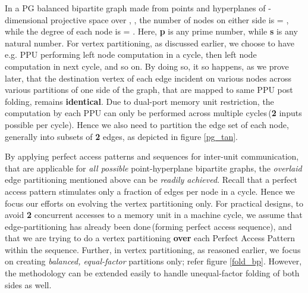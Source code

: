 \documentclass[12pt]{article}
\begin{document}
In a PG balanced bipartite graph made from points and hyperplanes of
{\normalsize }-dimensional projective space over {\normalsize },
{\normalsize }, the number of nodes on either side is
{\large } = {\large }, while the degree of
each node is {\large } = {\large }. Here,
{\normalsize \textbf{p}} is any prime number, while {\normalsize \textbf{s}} is any
natural number.
For vertex partitioning, as discussed earlier, we choose to have e.g.  PPU performing  left node computation in a cycle, then 
left node computation in next cycle, and so on. By doing so, it so happens,
as we prove later, that the destination vertex of each edge incident on
various nodes across various partitions of one side of the graph,
that are mapped to same PPU post folding, remains
\textbf{identical}. Due to dual-port memory unit restriction, the
computation by each PPU can only be performed
across multiple cycles\,(\textbf{2} inputs possible per cycle). Hence we also
need to partition the edge set of each node, generally into subsets of \textbf{2}
edges, as depicted in figure \ref{pg_tan}.

By applying perfect access patterns and sequences \cite{karm1} for
inter-unit communication, that are applicable for \textit{all possible} 
point-hyperplane bipartite graphs, the \textit{overlaid} edge partitioning mentioned above can be
\textit{readily achieved}.  Recall that a perfect access pattern stimulates only a
fraction of edges per node in a cycle. Hence we focus our efforts on
evolving the vertex partitioning  only.
For practical designs, to avoid  \textbf{2} concurrent accesses to a
memory unit in a machine cycle, we assume that edge-partitioning has
already been done\,(forming perfect access sequence), and that we are trying
to do a vertex partitioning \textbf{over} each Perfect Access Pattern
within the sequence. Further, in vertex partitioning, as
reasoned earlier, we focus on creating
\textit{balanced, equal-factor} partitions only; refer figure \ref{fold_bp}. However, the
methodology can be extended easily to handle unequal-factor folding of both
sides as well.
\end{document}
